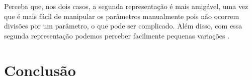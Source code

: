 \documentclass{article}
\begin{document}
	Perceba que, nos dois casos, a segunda representação é mais amigável, uma vez que é mais fácil de manipular os parâmetros manualmente pois não ocorrem divisões por um parâmetro, o que pode ser complicado. Além disso, com essa segunda representação podemos perceber facilmente pequenas variações \cite{stackexchange}.
	
	\section*{Conclusão}
	
	
	
	\printbibliography
	
\end{document}
